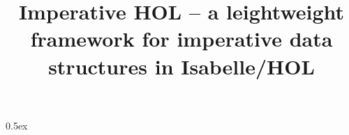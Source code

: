 \documentclass[11pt,a4paper]{article}
\renewcommand{\=}{\ ---\ }
\begin{document}
\title{Imperative HOL -- a leightweight framework for imperative data structures in Isabelle/HOL}
\maketitle

\parindent 0pt\parskip 0.5ex


\pagestyle{headings}


\end{document}
